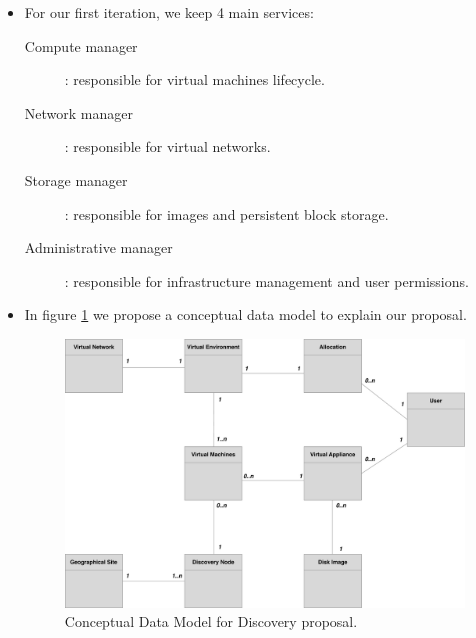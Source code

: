 \begin{itemize}

	\item For our first iteration, we keep 4 main services:
		\begin{description}

			\item [Compute manager] : responsible for virtual machines lifecycle.

			\item [Network manager] : responsible for virtual networks.

			\item [Storage manager] : responsible for images and persistent block storage.

			\item [Administrative manager] : responsible for infrastructure management and user permissions.  

		\end{description}


	\item In figure \ref{fig:mcd} we propose a conceptual data model to explain our proposal.


	\begin{figure}
		\centering
		\includegraphics[width=0.75\linewidth]{Figures/mcd_2.pdf}
		\caption{Conceptual Data Model for Discovery proposal.}%
		\label{fig:mcd}%
	\end{figure}


\end{itemize}